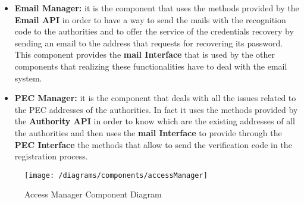 			\begin{itemize}
				\item \textbf{Email Manager:} it is the component that uses the methods provided by the \textbf{Email API} in order to have a way to send the mails with the recognition code to the authorities and to offer the service of the credentials recovery by sending an email to the address that requests for recovering its password. This component provides the \textbf{mail Interface} that is used by the other components that realizing these functionalities have to deal with the email system.
			
				\item \textbf{PEC Manager:} it is the component that deals with all the issues related to the PEC addresses of the authorities. In fact it uses the methods provided by the \textbf{Authority API} in order to know which are the existing addresses of all the authorities and then uses the \textbf{mail Interface} to provide through the \textbf{PEC Interface} the methods that allow to send the verification code in the registration process.
			\end{itemize}
			
			\begin{figure}[ht]
				\centering
				\texttt{[image: /diagrams/components/accessManager]}
				\caption{\label{fig:accessManagerComp} Access Manager Component Diagram}
			\end{figure}
		

